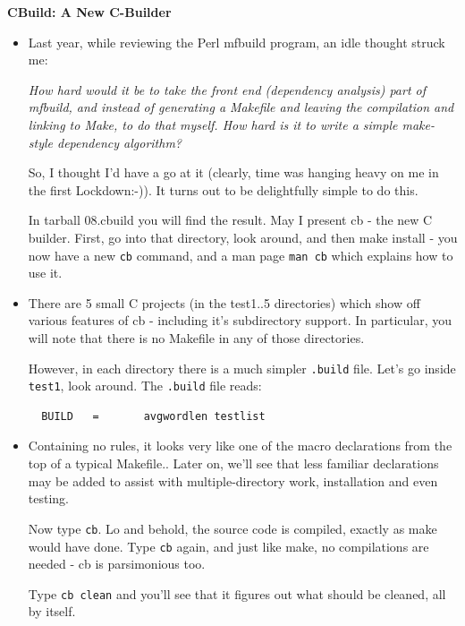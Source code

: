\documentclass[handout]{beamer}
\newcommand\myheading[1]{%
  \par\bigskip
  {\Large\bfseries#1}\par\smallskip}
\begin{document}
\begin{frame}[fragile]

  \myheading{CBuild: A New C-Builder}

    \begin{itemize}
      \item
      Last year, while reviewing the Perl mfbuild program, an idle thought struck me:

    \pitem
      {\em How hard would it be to take the front end (dependency analysis)
      part of mfbuild, and instead of generating a Makefile and leaving
      the compilation and linking to Make, to do that myself.  How hard is
      it to write a simple make-style dependency algorithm?}

     \pitem
       So, I thought I'd have a go at it (clearly, time was hanging heavy on me
       in the first Lockdown:-)).  It turns out to be delightfully simple to
       do this.

      \pitem
      In \alert{tarball 08.cbuild} you will find the result.  May I present
      \alert{cb} - the new C builder.  
      First, go into that directory, look around,
      and then \alert{make install} - you now have a new \verb+cb+ command,
      and a man page \verb+man cb+ which explains how to use it.

    \end{itemize}

\end{frame}


\begin{frame}[fragile]
  \begin{itemize}

  \item
  There are 5 small C projects (in the test1..5 directories) which show off
  various features of \alert{cb} - including it's subdirectory support.  In
  particular, you will note that there is \alert{no Makefile} in any of
  those directories.

  \pitem
  However, in each directory there is a much simpler \verb+.build+ file.
  Let's go inside \verb+test1+, look around. The \verb+.build+ file reads:

\tiny
\begin{verbatim}
  BUILD   =       avgwordlen testlist
\end{verbatim}
\small

  \item
  Containing no rules, it looks very like one of the macro declarations
  from the top of a typical Makefile..
  \pause
  Later on, we'll see that less familiar declarations may be added to
  assist with multiple-directory work, installation and even testing.

  \pitem
  Now type \verb+cb+.  Lo and behold, the source code is compiled,
  exactly as make would have done.  
  Type \verb+cb+ again, and just like make, no compilations are needed -
  \alert{cb} is parsimonious too.

  \pitem
  Type \verb+cb clean+ and you'll see that it figures out what should be
  cleaned, all by itself.

  \end{itemize}
\end{frame}
\end{document}
